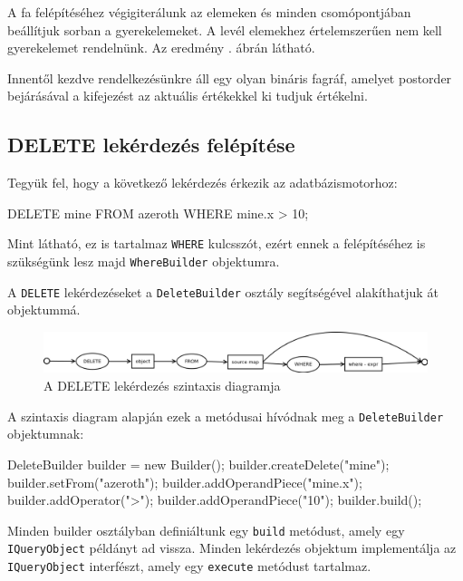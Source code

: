 A fa felépítéséhez végigiterálunk az elemeken és minden csomópontjában beállítjuk sorban a gyerekelemeket. A levél elemekhez értelemszerűen nem kell gyerekelemet rendelnünk. Az eredmény . ábrán látható.

Innentől kezdve rendelkezésünkre áll egy olyan bináris fagráf, amelyet postorder bejárásával a kifejezést az aktuális értékekkel ki tudjuk értékelni.

\subsection{DELETE lekérdezés felépítése}

Tegyük fel, hogy a következő lekérdezés érkezik az adatbázismotorhoz:
\begin{sql}
DELETE mine FROM azeroth WHERE mine.x > 10;
\end{sql}
Mint látható, ez is tartalmaz \texttt{WHERE} kulcsszót, ezért ennek a felépítéséhez is szükségünk lesz majd \texttt{WhereBuilder} objektumra.

A \texttt{DELETE} lekérdezéseket a \texttt{DeleteBuilder} osztály segítségével alakíthatjuk át objektummá.

\begin{figure}[htb]
	\begin{center}
		\includegraphics[scale=0.4]{images/delete}
		\caption{A DELETE lekérdezés szintaxis diagramja}
		\label{fig:deleteSytnax}
	\end{center}
\end{figure}

A szintaxis diagram alapján ezek a metódusai hívódnak meg a \texttt{DeleteBuilder} objektumnak:

\begin{java}
DeleteBuilder builder = new Builder();
builder.createDelete("mine");
builder.setFrom("azeroth");
builder.addOperandPiece("mine.x");
builder.addOperator(">");
builder.addOperandPiece("10");
builder.build();
\end{java}

Minden builder osztályban definiáltunk egy \texttt{build} metódust, amely egy \texttt{IQueryObject} példányt ad vissza. Minden lekérdezés objektum implementálja az \texttt{IQueryObject} interfészt, amely egy \texttt{execute} metódust tartalmaz.

